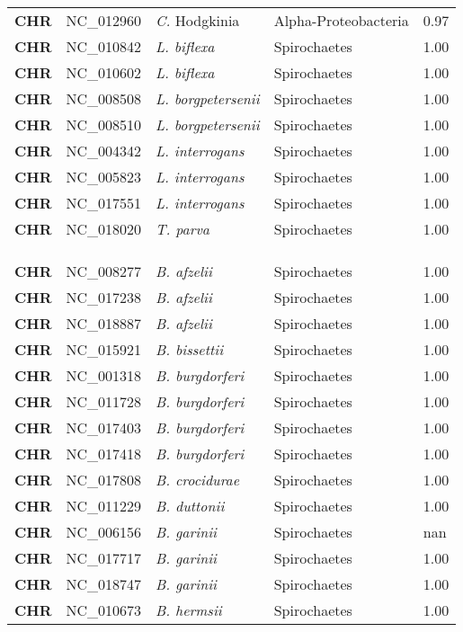 \begin{adjustwidth}{-3cm}{2cm}
{\begin{supertabular}{>{\bfseries}l|p{0.1\textwidth}p{0.14\textwidth}l|l}
CHR & NC\_012960 & \textit{C.} Hodgkinia & Alpha-Proteobacteria & 0.97\\
CHR & NC\_010842 & \textit{L. biflexa} & Spirochaetes & 1.00\\
CHR & NC\_010602 & \textit{L. biflexa} & Spirochaetes & 1.00\\
CHR & NC\_008508 & \textit{L. borgpetersenii} & Spirochaetes & 1.00\\
CHR & NC\_008510 & \textit{L. borgpetersenii} & Spirochaetes & 1.00\\
CHR & NC\_004342 & \textit{L. interrogans} & Spirochaetes & 1.00\\
CHR & NC\_005823 & \textit{L. interrogans} & Spirochaetes & 1.00\\
CHR & NC\_017551 & \textit{L. interrogans} & Spirochaetes & 1.00\\
CHR & NC\_018020 & \textit{T. parva} & Spirochaetes & 1.00\\
\\
\\
\hline\\
CHR & NC\_008277 & \textit{B. afzelii} & Spirochaetes & 1.00\\
CHR & NC\_017238 & \textit{B. afzelii} & Spirochaetes & 1.00\\
CHR & NC\_018887 & \textit{B. afzelii} & Spirochaetes & 1.00\\
CHR & NC\_015921 & \textit{B. bissettii} & Spirochaetes & 1.00\\
CHR & NC\_001318 & \textit{B. burgdorferi} & Spirochaetes & 1.00\\
CHR & NC\_011728 & \textit{B. burgdorferi} & Spirochaetes & 1.00\\
CHR & NC\_017403 & \textit{B. burgdorferi} & Spirochaetes & 1.00\\
CHR & NC\_017418 & \textit{B. burgdorferi} & Spirochaetes & 1.00\\
CHR & NC\_017808 & \textit{B. crocidurae} & Spirochaetes & 1.00\\
CHR & NC\_011229 & \textit{B. duttonii} & Spirochaetes & 1.00\\
CHR & NC\_006156 & \textit{B. garinii} & Spirochaetes & nan\\
CHR & NC\_017717 & \textit{B. garinii} & Spirochaetes & 1.00\\
CHR & NC\_018747 & \textit{B. garinii} & Spirochaetes & 1.00\\
CHR & NC\_010673 & \textit{B. hermsii} & Spirochaetes & 1.00\\

\end{supertabular}}
\end{adjustwidth}
